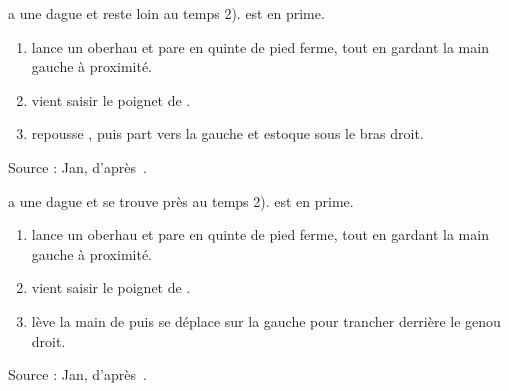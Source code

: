 \begin{technique}

\A a une dague et reste loin au temps 2).
\D est en prime.

\begin{enumerate}
	\item \A lance un oberhau et \D pare en quinte de pied ferme, tout en gardant la main gauche à proximité.
	
	\item \D vient saisir le poignet de \A.
	
	\item \D repousse \A, puis part vers la gauche et estoque sous le bras droit.
\end{enumerate}

Source : Jan, d'après~\cite{kleinau:dijon:rapier_messer:2015}.

\end{technique}


\begin{technique}

\A a une dague et se trouve près au temps 2).
\D est en prime.

\begin{enumerate}
	\item \A lance un oberhau et \D pare en quinte de pied ferme, tout en gardant la main gauche à proximité.
	
	\item \D vient saisir le poignet de \A.
	
	\item \D lève la main de \A puis se déplace sur la gauche pour trancher derrière le genou droit.
\end{enumerate}

Source : Jan, d'après~\cite{kleinau:dijon:rapier_messer:2015}.

\end{technique}


